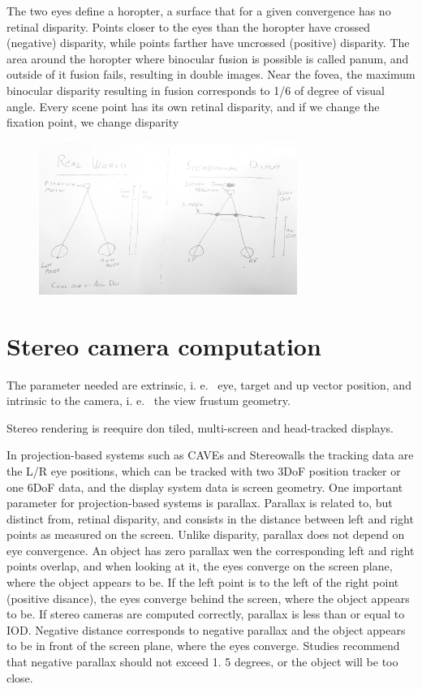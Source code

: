 \documentclass[a4paper]{article}
\begin{document}
\begin{itemize}
  The two eyes define a horopter, a surface that for a given convergence
  has no retinal disparity.
Points closer to the eyes than the horopter
  have crossed (negative) disparity, while points farther have uncrossed
  (positive) disparity.
The area around the horopter where binocular
  fusion is possible is called panum, and outside of it fusion fails,
  resulting in double images.
Near the fovea, the maximum binocular
  disparity resulting in fusion corresponds to 1/6 of degree of visual
  angle.
Every scene point has its own retinal disparity, and if we
  change the fixation point, we change disparity
\end{itemize}
    \begin{figure}
      \centering
  \includegraphics[width=0.75\textwidth]{acc-vs-conv}
    \end{figure}

\section{Stereo camera computation}

The parameter needed are extrinsic, i.
e.
~eye, target and up vector
position, and intrinsic to the camera, i.
e.
~the view frustum geometry.

Stereo rendering is reequire don tiled, multi-screen and head-tracked
displays.

In projection-based systems such as CAVEs and Stereowalls the tracking
data are the L/R eye positions, which can be tracked with two 3DoF
position tracker or one 6DoF data, and the display system data is screen
geometry.
One important parameter for projection-based systems is
parallax.
Parallax is related to, but distinct from, retinal disparity,
and consists in the distance between left and right points as measured
on the screen.
Unlike disparity, parallax does not depend on eye
convergence.
An object has zero parallax wen the corresponding left and
right points overlap, and when looking at it, the eyes converge on the
screen plane, where the object appears to be.
If the left point is to
the left of the right point (positive disance), the eyes converge behind
the screen, where the object appears to be.
If stereo cameras are
computed correctly, parallax is less than or equal to IOD.
Negative
distance corresponds to negative parallax and the object appears to be
in front of the screen plane, where the eyes converge.
Studies recommend
that negative parallax should not exceed 1.
5 degrees, or the object will
be too close.
\end{document}
